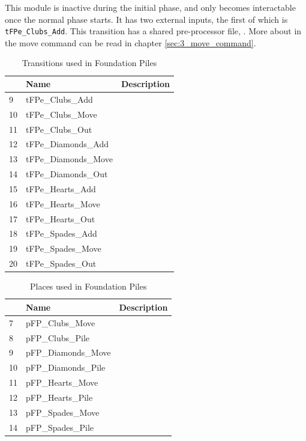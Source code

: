 \documentclass[runningheads,a4paper]{llncs}
\begin{document}
This module is inactive during the initial phase, and only becomes interactable once the normal phase starts. It has two external inputs, the first of which is \verb!tFPe_Clubs_Add!. This transition has a shared pre-processor file, . More about in the move command can be read in chapter \ref{sec:3_move_command}.
\begin{table}
	\caption{Transitions used in Foundation Piles}
	\begin{tabular}{|l|l|l|}
		\hline
		& Name & Description \\
		\hline
		9  & tFPe\_Clubs\_Add         &    \\ \hline
		10 & tFPe\_Clubs\_Move        &    \\ \hline
		11 & tFPe\_Clubs\_Out         &    \\ \hline
		12 & tFPe\_Diamonds\_Add      &    \\ \hline
		13 & tFPe\_Diamonds\_Move     &    \\ \hline
		14 & tFPe\_Diamonds\_Out      &    \\ \hline
		15 & tFPe\_Hearts\_Add        &    \\ \hline
		16 & tFPe\_Hearts\_Move       &    \\ \hline
		17 & tFPe\_Hearts\_Out        &    \\ \hline
		18 & tFPe\_Spades\_Add        &    \\ \hline
		19 & tFPe\_Spades\_Move       &    \\ \hline
		20 & tFPe\_Spades\_Out        &    \\ \hline
	\end{tabular}
\end{table}
\begin{table}
	\caption{Places used in Foundation Piles}
	\begin{tabular}{|l|l|l|}
		\hline
		& Name & Description \\
		\hline
		7  & pFP\_Clubs\_Move          &  \\ \hline
		8  & pFP\_Clubs\_Pile          &  \\ \hline
		9  & pFP\_Diamonds\_Move       &  \\ \hline
		10 & pFP\_Diamonds\_Pile       &  \\ \hline
		11 & pFP\_Hearts\_Move         &  \\ \hline
		12 & pFP\_Hearts\_Pile         &  \\ \hline
		13 & pFP\_Spades\_Move         &  \\ \hline
		14 & pFP\_Spades\_Pile         &  \\ \hline
	\end{tabular}
\end{table}
\end{document}
